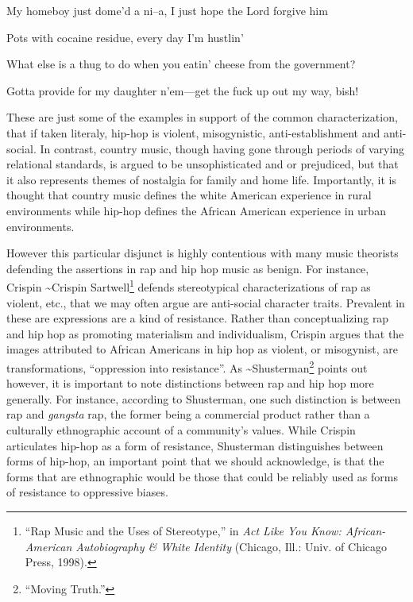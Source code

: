 \documentclass[phdthesis,12pt,final]{wuthesis}
\theoremstyle{definition}
\theoremstyle{definition}
\theoremstyle{definition}
\theoremstyle{definition}
\theoremstyle{remark}
\begin{document}
My homeboy just dome'd a ni--a, I just hope the Lord forgive him

Pots with cocaine residue, every day I'm hustlin'

What else is a thug to do when you eatin' cheese from the government?

Gotta provide for my daughter n'em---get the fuck up out my way, bish!

These are just some of the examples in support of the common characterization, that if taken literaly, hip-hop is violent, misogynistic, anti-establishment and anti-social. In contrast, country music, though having gone through periods of varying relational standards, is argued to be unsophisticated and or prejudiced, but that it also represents themes of nostalgia for family and home life. Importantly, it is thought that country music defines the white American experience in rural environments while hip-hop defines the African American experience in urban environments.

However this particular disjunct is highly contentious with many music theorists defending the assertions in rap and hip hop music as benign. For instance, Crispin \textasciitilde{}Crispin Sartwell\footnote{{``Rap {Music} and the {Uses} of {Stereotype},''} in \emph{Act Like You Know: {African-American} Autobiography \& White Identity} (Chicago, Ill.: Univ. of Chicago Press, 1998).} defends stereotypical characterizations of rap as violent, etc., that we may often argue are anti-social character traits. Prevalent in these are expressions are a kind of resistance. Rather than conceptualizing rap and hip hop as promoting materialism and individualism, Crispin argues that the images attributed to African Americans in hip hop as violent, or misogynist, are transformations, ``oppression into resistance''. As \textasciitilde{}Shusterman\footnote{{``Moving {Truth}.''}} points out however, it is important to note distinctions between rap and hip hop more generally. For instance, according to Shusterman, one such distinction is between rap and \emph{gangsta} rap, the former being a commercial product rather than a culturally ethnographic account of a community's values. While Crispin articulates hip-hop as a form of resistance, Shusterman distinguishes between forms of hip-hop, an important point that we should acknowledge, is that the forms that are ethnographic would be those that could be reliably used as forms of resistance to oppressive biases.
\end{document}
